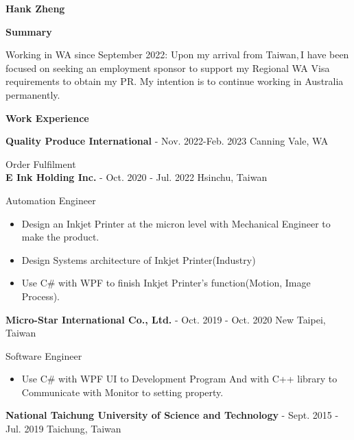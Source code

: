 \documentclass[11pt a4paper]{article}
\begin{document}
\begin{Huge}
\textbf{Hank Zheng}\\
\end{Huge}


\begin{LARGE}
\textbf{Summary
\hrulefill
}
\end{LARGE}

Working in WA since September 2022:  Upon my arrival from Taiwan,\,I have been focused on seeking an employment sponsor to support my Regional WA Visa requirements to obtain my PR. My intention is to continue working in Australia permanently.\\

\begin{LARGE}


\textbf{Work Experience
\hrulefill
}
\end{LARGE}

\textbf{Quality Produce International} - Nov. 2022-Feb. 2023 Canning Vale, WA 

Order Fulfilment\\

\textbf{E Ink Holding Inc.} - Oct. 2020 - Jul. 2022 Hsinchu, Taiwan

Automation Engineer
\begin{itemize}
        \item {Design an Inkjet Printer at the micron level with Mechanical Engineer to make the product.}
        \item {Design Systems architecture of Inkjet Printer(Industry)}
        \item {Use C\# with WPF to finish Inkjet Printer's function(Motion, Image Process).}
\end{itemize}

\textbf{Micro-Star International Co., Ltd.} - Oct. 2019 - Oct. 2020 New Taipei, Taiwan 

Software Engineer
\begin{itemize}
\item {Use C\# with WPF UI to Development Program And with C++ library to Communicate with Monitor to setting property.}
\end{itemize} 
\textbf{National Taichung University of Science and Technology} - Sept. 2015 - Jul. 2019 Taichung, Taiwan
\end{document}

